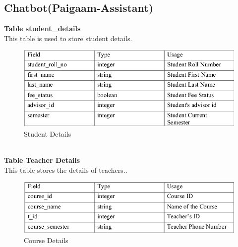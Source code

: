 \subsection{Chatbot(Paigaam-Assistant)}
\noindent \textbf{Table student\_details}\\
\noindent This table is used to store student details.\\
\begin{figure}[ht]
\centering
\includegraphics[scale=0.5]{input/images/t7.png}
\caption{Student Details}
\end{figure}\\\newpage
\noindent \textbf{Table Teacher Details	}\\
\noindent This table stores the details of teachers..\\
\begin{figure}[ht]
\centering
\includegraphics[scale=0.5]{input/images/t9.png}
\caption{Course Details}
\end{figure}\newpage
